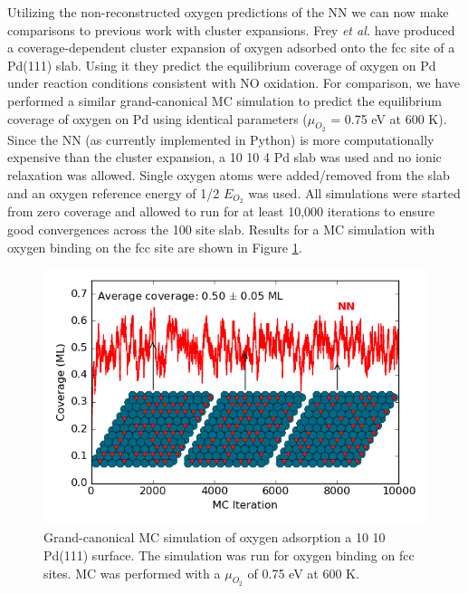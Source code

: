 \documentclass[12pt]{cmuthesis}
\begin{document}
Utilizing the non-reconstructed oxygen predictions of the NN we can now make comparisons to previous work with cluster expansions. Frey \emph{et al.}  have produced a coverage-dependent cluster expansion of oxygen adsorbed onto the fcc site of a Pd(111) slab. Using it they predict the equilibrium coverage of oxygen on Pd under reaction conditions consistent with NO oxidation. For comparison, we have performed a similar grand-canonical MC simulation to predict the equilibrium coverage of oxygen on Pd using identical
parameters (\(\mu_{O_{2}}\) = 0.75 eV at 600 K). Since the NN (as currently implemented in Python) is more computationally expensive than the cluster expansion, a 10 \texttimes{} 10 \texttimes{} 4 Pd slab was used and no ionic relaxation was allowed. Single oxygen atoms were added/removed from the slab and an oxygen reference energy of 1/2 \(E_{O_{2}}\) was used. All simulations were started from zero coverage and allowed to run for at least 10,000 iterations to ensure good convergences across the 100 site slab. Results for a MC simulation with oxygen binding on the fcc site are shown in Figure \ref{fig-PdO-MC}.

\begin{figure}[htbp]
\centering
\includegraphics[width=5in]{./images/Pd-MC.png}
\caption{\label{fig-PdO-MC}
Grand-canonical MC simulation of oxygen adsorption a 10 \texttimes{} 10 Pd(111) surface. The simulation was run for oxygen binding on fcc sites. MC was performed with a \(\mu_{O_{2}}\) of 0.75 eV at 600 K.}
\end{figure}
\end{document}
